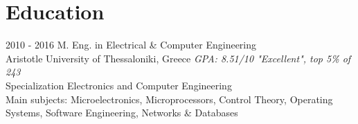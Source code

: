 \documentclass[]{friggeri-cv}
\begin{document}
\section{Education}
\begin{entrylist}
	\entry
	{2010 - 2016}
	{M. Eng. in Electrical \& Computer Engineering}
	{\\Aristotle University of Thessaloniki, Greece}
	{\emph{GPA: 8.51/10 "Excellent", top 5\% of 243}\\
		Specialization Electronics and Computer Engineering\\
		Main subjects: Microelectronics, Microprocessors, Control Theory, Operating Systems, Software Engineering, Networks \& Databases
		}
\end{entrylist}

\vspace{-\parsep}
\end{document}
